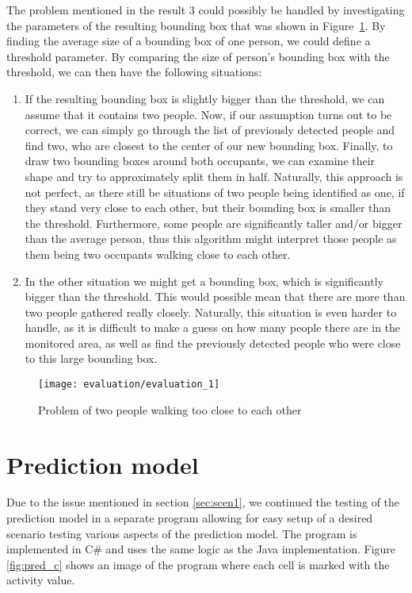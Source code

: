 The problem mentioned in the result 3 could possibly be handled by investigating the parameters of the resulting bounding box that was shown in Figure~\ref{fig:evaluation_1}. By finding the average size of a bounding box of one person, we could define a threshold parameter. By comparing the size of person's bounding box with the threshold, we can then have the following situations:

\begin{enumerate}
\item If the resulting bounding box is slightly bigger than the threshold, we can assume that it contains two people. Now, if our assumption turns out to be correct, we can simply go through the list of previously detected people and find two, who are closest to the center of our new bounding box. Finally, to draw two bounding boxes around both occupants, we can examine their shape and try to approximately split them in half. Naturally, this approach is not perfect, as there still be situations of two people being identified as one, if they stand very close to each other, but their bounding box is smaller than the threshold. Furthermore, some people are significantly taller and/or bigger than the average person, thus this algorithm might interpret those people as them being two occupants walking close to each other.
\item In the other situation we might get a bounding box, which is significantly bigger than the threshold. This would possible mean that there are more than two people gathered really closely. Naturally, this situation is even harder to handle, as it is difficult to make a guess on how many people there are in the monitored area, as well as find the previously detected people who were close to this large bounding box.
\end{enumerate}

\begin{figure}[htb]
	\centering
	\texttt{[image: evaluation/evaluation\_1]}
	\caption{Problem of two people walking too close to each other}
	\label{fig:evaluation_1}
\end{figure}

\section{Prediction model}
\label{eval_prediction}
Due to the issue mentioned in section \ref{sec:scen1}, we continued the testing of the prediction model in a separate program allowing for easy setup of a desired scenario testing various aspects of the prediction model. The program is implemented in C\# and uses the same logic as the Java implementation. Figure \ref{fig:pred_c} shows an image of the program where each cell is marked with the activity value. 

